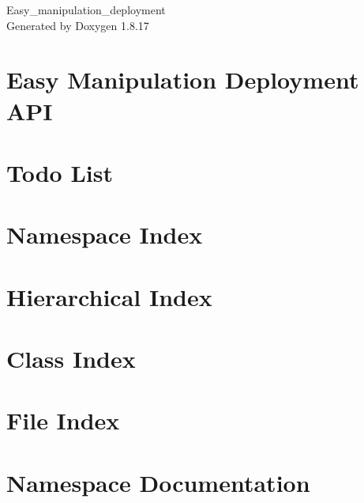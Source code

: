 \let\mypdfximage\pdfximage\def\pdfximage{\immediate\mypdfximage}\documentclass[twoside]{book}
\newcommand{\+}{\discretionary{\mbox{\scriptsize$\hookleftarrow$}}{}{}}
\newcommand{\clearemptydoublepage}{%
  \newpage{\pagestyle{empty}\cleardoublepage}%
}
\begin{document}
\hypersetup{pageanchor=false,
             bookmarksnumbered=true,
             pdfencoding=unicode
            }
\begin{titlepage}
\vspace*{7cm}
\begin{center}%
{\Large Easy\+\_\+manipulation\+\_\+deployment }\\
\vspace*{1cm}
{\large Generated by Doxygen 1.8.17}\\
\end{center}
\end{titlepage}
\clearemptydoublepage
{}
\tableofcontents
\clearemptydoublepage
{}
\hypersetup{pageanchor=true}

\chapter{Easy Manipulation Deployment A\+PI}
\label{index}\hypertarget{index}{}
\chapter{Todo List}
\label{todo}

\chapter{Namespace Index}

\chapter{Hierarchical Index}

\chapter{Class Index}

\chapter{File Index}

\chapter{Namespace Documentation}












\end{document}
